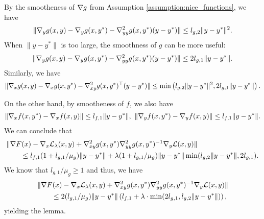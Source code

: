 By the smootheness of $\nabla g$ from Assumption \ref{assumption:nice_functions}, we have
\begin{align*}
    \| \nabla_y g(x, y) - \nabla_y g(x, y^*) - \nabla_{yy}^2 g(x, y^*) (y - y^*) \| \le l_{g,2} \|y - y^*\|^2.
\end{align*}
When $\|y - y^*\|$ is too large, the smoothness of $g$ can be more useful:
\begin{align*}
    \| \nabla_y g(x, y) - \nabla_y g(x, y^*) - \nabla_{yy}^2 g(x, y^*) (y - y^*) \| \le 2 l_{g,1} \|y - y^*\|. 
\end{align*}
Similarly, we have
\begin{align*}
    \| \nabla_x g(x, y) - \nabla_x g(x, y^*) - \nabla_{xy}^2 g(x, y^*)^\top (y - y^*) \| \le \min \left(l_{g,2} \|y - y^*\|^2, 2l_{g,1} \|y-y^*\| \right). 
\end{align*}


On the other hand, by smootheness of $f$, we also have
\begin{align*}
    \|\grad_x f(x,y^*) - \grad_x f(x,y) \| \le l_{f,1} \|y - y^*\|, \ \|\grad_y f(x,y^*) - \grad_y f(x,y) \| \le l_{f,1} \|y - y^*\|.  
\end{align*}
We can conclude that
\begin{align*}
    &\| \nabla F(x) - \nabla_x \mathcal{L}_\lambda(x,y) + \nabla_{xy}^2 g(x,y^*) \nabla_{yy}^{2} g(x,y^*)^{-1} \nabla_y \mathcal{L}(x,y) \| \\
    &\qquad \le l_{f,1} (1 + l_{g,1}/\mu_g) \|y - y^*\| + \lambda (1 + l_{g,1}/\mu_g) \|y-y^*\| \min(l_{g,2} \|y-y^*\|, 2l_{g,1}).
\end{align*}
We know that $l_{g,1}/\mu_g \ge 1$ and thus, we have
\begin{align*}
    &\| \nabla F(x) - \nabla_x \mathcal{L}_\lambda(x,y) + \nabla_{xy}^2 g(x,y^*) \nabla_{yy}^{2} g(x,y^*)^{-1} \nabla_y \mathcal{L}(x,y) \| \\
    &\qquad \le 2 (l_{g,1}/\mu_g) \|y-y^*\| \left(l_{f,1} + \lambda \cdot \min(2l_{g,1}, l_{g,2} \|y-y^*\|)\right),
\end{align*}
yielding the lemma.







